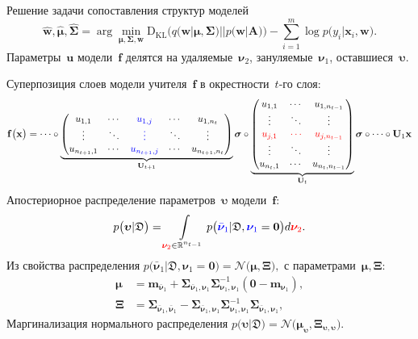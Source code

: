 \documentclass[10pt,pdf,hyperref={unicode}]{beamer}
\begin{document}
\begin{frame}{Решение задачи сопоставления структур моделей}\vspace{-.4cm}
\[
\hat{\mathbf{w}}, \hat{\bm{\mu}}, \hat{\bm{\Sigma}} = \arg \min_{\bm{\mu}, \bm{\Sigma}, \mathbf{w}} \text{D}_{\text{KL}}\bigr(q\bigr(\mathbf{w}|\bm{\mu}, \bm{\Sigma}\bigr)||p\bigr(\mathbf{w}|\mathbf{A}\bigr)\bigr) - \sum_{i=1}^{m}\log p\bigr(y_i|\mathbf{x}_{i}, \mathbf{w}\bigr).
\]
Параметры~$\mathbf{u}$ модели~$\mathbf{f}$ делятся на {\color{red} удаляемые~$\bm{\nu}_2$}, {\color{blue} зануляемые~$\bm{\nu}_1$}, {оставшиеся~$\bm{\upsilon}$}.

Суперпозиция слоев модели учителя~$\mathbf{f}$ в окрестности~$t$-го слоя:
{\small
\[
\setlength\abovedisplayskip{0pt}
\mathbf{f}\bigr(\mathbf{x}\bigr) = \cdots \circ
\underbrace{
\begin{pmatrix}
u_{1,1} & \cdots & {\color{blue} u_{1,j}} & \cdots & u_{1,n_{t}} \\
\vdots  & \ddots & {\color{blue} \vdots}  & \ddots & \vdots \\
u_{n_{t+1},1} & \cdots & {\color{blue} u_{n_{t+1},j}} & \cdots & u_{n_{t+1},n_{t}} \\
\end{pmatrix} 
}_{\mathbf{U}_{t+1}}
\bm{\sigma} 
\circ 
\underbrace{
\begin{pmatrix}
u_{1,1} & \cdots & u_{1,n_{t-1}} \\
\vdots  & \ddots & \vdots        \\
{\color{red} u_{j,1}} & {\color{red}\cdots} & {\color{red} u_{j,n_{t-1}}} \\
\vdots  & \ddots & \vdots        \\
u_{n_{t},1} & \cdots & u_{n_{t},n_{t-1}} \\
\end{pmatrix}
}_{\mathbf{U}_{t}}
\bm{\sigma}
\circ 
\cdots
\circ 
\mathbf{U}_1
\mathbf{x}
\setlength\belowdisplayskip{0pt}
\]
}
Апостериорное распределение параметров~$\bm{\upsilon}$ модели~$\mathbf{f}$:
\[
\setlength\abovedisplayskip{0pt}
p\bigr(\bm{\upsilon}|\mathfrak{D}\bigr)  = \int\limits_{{\color{red} \bm{\nu}_2} \in \mathbb{R}^{n_{t-1}}}p\bigr({\color{blue}\bar{\bm{\nu}}_1}|\mathfrak{D}, {\color{blue}\bm{\nu}_1}=\mathbf{0}\bigr) d{\color{red} \bm{\nu}_2}.
\setlength\belowdisplayskip{0pt}
\]
Из свойства распределения 
$
    p\bigr(\bar{\bm{\nu}}_1|\mathfrak{D}, \bm{\nu}_1=\mathbf{0}\bigr) = \mathcal{N}\bigr(\bm{\mu}, \bm{\Xi}\bigr),
$
с параметрами~$\bm{\mu}, \bm{\Xi}$:
\[
\begin{aligned}
\bm{\mu} &= \mathbf{m}_{\bar{\bm{\nu}}_1}+\bm{\Sigma}_{\bar{\bm{\nu}}_1,\bm{\nu}_1} \bm{\Sigma}_{\bm{\nu}_1,\bm{\nu}_1}^{-1} \left(\mathbf{0} - \mathbf{m}_{\bm{\nu}_1}\right), \\
 \bm{\Xi} &= \bm{\Sigma}_{\bar{\bm{\nu}}_1,\bar{\bm{\nu}}_1} - \bm{\Sigma}_{\bar{\bm{\nu}}_1,\bm{\nu}_1} \bm{\Sigma}_{\bm{\nu}_1,\bm{\nu}_1}^{-1} \bm{\Sigma}_{\bar{\bm{\nu}}_1,\bm{\nu}_1},
\end{aligned}
\]
Маргинализация нормального распределения
$
p\bigr(\bm{\upsilon}|\mathfrak{D}\bigr) = \mathcal{N}\bigr(\bm{\mu}_{\bm{\upsilon}},  \bm{\Xi}_{\bm{\upsilon}, \bm{\upsilon}}\bigr).
$
\end{frame}
\end{document}
